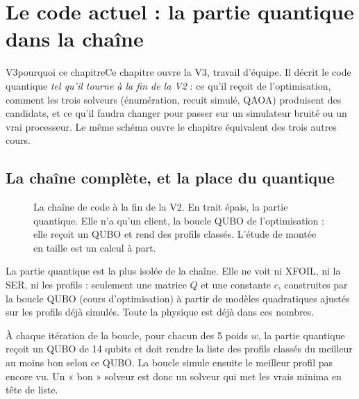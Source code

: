 \chapter{Le code actuel : la partie quantique dans la chaîne}\label{ch:code-actuel}


\begin{evolution}{V3}{pourquoi ce chapitre}Ce chapitre ouvre la V3, travail d'équipe. Il décrit le code quantique \emph{tel qu'il tourne à la fin de la V2} : ce qu'il reçoit de l'optimisation, comment les trois solveurs (énumération, recuit simulé, QAOA) produisent des candidats, et ce qu'il faudra changer pour passer sur un simulateur bruité ou un vrai processeur. Le même schéma ouvre le chapitre équivalent des trois autres cours.\end{evolution}

\section{La chaîne complète, et la place du quantique}
\begin{figure}[htbp]
\centering
{}
\caption{La chaîne de code à la fin de la V2. En trait épais, la partie quantique. Elle n'a qu'un client, la boucle QUBO de l'optimisation : elle reçoit un QUBO et rend des profils classés. L'étude de montée en taille est un calcul à part.}\label{fig:chaine-quant}
\end{figure}

La partie quantique est la plus isolée de la chaîne. Elle ne voit ni XFOIL, ni la SER, ni les profils : seulement une matrice $Q$ et une constante $c$, construites par la boucle QUBO (cours d'optimisation) à partir de modèles quadratiques ajustés sur les profils déjà simulés. Toute la physique est déjà dans ces nombres.

\begin{projet}
À chaque itération de la boucle, pour chacun des 5 poids $w$, la partie quantique reçoit un QUBO de 14 qubits et doit rendre la liste des profils classés du meilleur au moins bon selon ce QUBO. La boucle simule ensuite le meilleur profil pas encore vu. Un « bon » solveur est donc un solveur qui met les vrais minima en tête de liste.
\end{projet}

